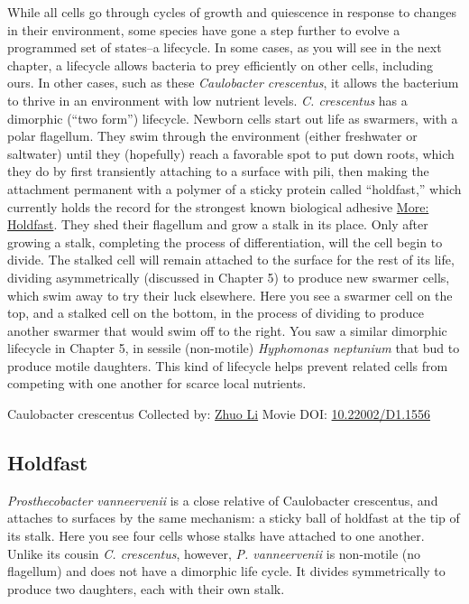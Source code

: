 \documentclass[]{tufte-book}
\begin{document}
While all cells go through cycles of growth and quiescence in response to changes in their environment, some species have gone a step further to evolve a programmed set of states--a lifecycle. In some cases, as you will see in the next chapter, a lifecycle allows bacteria to prey efficiently on other cells, including ours. In other cases, such as these \emph{Caulobacter crescentus}, it allows the bacterium to thrive in an environment with low nutrient levels. \emph{C. crescentus} has a dimorphic (``two form'') lifecycle. Newborn cells start out life as swarmers, with a polar flagellum. They swim through the environment (either freshwater or saltwater) until they (hopefully) reach a favorable spot to put down roots, which they do by first transiently attaching to a surface with pili, then making the attachment permanent with a polymer of a sticky protein called ``holdfast,'' which currently holds the record for the strongest known biological adhesive \protect\hyperlink{Holdfast}{More: Holdfast}. They shed their flagellum and grow a stalk in its place. Only after growing a stalk, completing the process of differentiation, will the cell begin to divide. The stalked cell will remain attached to the surface for the rest of its life, dividing asymmetrically (discussed in Chapter 5) to produce new swarmer cells, which swim away to try their luck elsewhere. Here you see a swarmer cell on the top, and a stalked cell on the bottom, in the process of dividing to produce another swarmer that would swim off to the right. You saw a similar dimorphic lifecycle in Chapter 5, in sessile (non-motile) \emph{Hyphomonas neptunium} that bud to produce motile daughters. This kind of lifecycle helps prevent related cells from competing with one another for scarce local nutrients.



\hypertarget{htmlwidget-b8c22b0e45426594f1ad}{}

\label{fig:8-4}Caulobacter crescentus Collected by: \protect\hyperlink{zhuo_li}{Zhuo Li} Movie DOI: \href{https://doi.org/10.22002/D1.1556}{10.22002/D1.1556}

\hypertarget{Holdfast}{%
\subsection{Holdfast}\label{Holdfast}}

\emph{Prosthecobacter vanneervenii} is a close relative of Caulobacter crescentus, and attaches to surfaces by the same mechanism: a sticky ball of holdfast at the tip of its stalk. Here you see four cells whose stalks have attached to one another. Unlike its cousin \emph{C. crescentus}, however, \emph{P. vanneervenii} is non-motile (no flagellum) and does not have a dimorphic life cycle. It divides symmetrically to produce two daughters, each with their own stalk.
\end{document}
